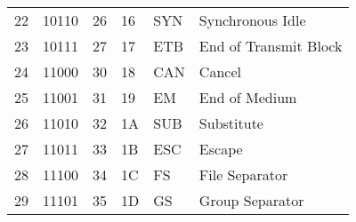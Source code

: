 \begin{center}
\begin{longtable}{llllll}
\rowcolor[HTML]{F3F6F6} 
{\color[HTML]{404040} 22}               & {\color[HTML]{404040} 10110}           & {\color[HTML]{404040} 26}             & {\color[HTML]{404040} 16}                   & {\color[HTML]{404040} SYN}                & {\color[HTML]{404040} Synchronous Idle}                      \\
\rowcolor[HTML]{FCFCFC} 
{\color[HTML]{404040} 23}               & {\color[HTML]{404040} 10111}           & {\color[HTML]{404040} 27}             & {\color[HTML]{404040} 17}                   & {\color[HTML]{404040} ETB}                & {\color[HTML]{404040} End of Transmit Block}                 \\
\rowcolor[HTML]{F3F6F6} 
{\color[HTML]{404040} 24}               & {\color[HTML]{404040} 11000}           & {\color[HTML]{404040} 30}             & {\color[HTML]{404040} 18}                   & {\color[HTML]{404040} CAN}                & {\color[HTML]{404040} Cancel}                                \\
\rowcolor[HTML]{FCFCFC} 
{\color[HTML]{404040} 25}               & {\color[HTML]{404040} 11001}           & {\color[HTML]{404040} 31}             & {\color[HTML]{404040} 19}                   & {\color[HTML]{404040} EM}                 & {\color[HTML]{404040} End of Medium}                         \\
\rowcolor[HTML]{F3F6F6} 
{\color[HTML]{404040} 26}               & {\color[HTML]{404040} 11010}           & {\color[HTML]{404040} 32}             & {\color[HTML]{404040} 1A}                   & {\color[HTML]{404040} SUB}                & {\color[HTML]{404040} Substitute}                            \\
\rowcolor[HTML]{FCFCFC} 
{\color[HTML]{404040} 27}               & {\color[HTML]{404040} 11011}           & {\color[HTML]{404040} 33}             & {\color[HTML]{404040} 1B}                   & {\color[HTML]{404040} ESC}                & {\color[HTML]{404040} Escape}                                \\
\rowcolor[HTML]{F3F6F6} 
{\color[HTML]{404040} 28}               & {\color[HTML]{404040} 11100}           & {\color[HTML]{404040} 34}             & {\color[HTML]{404040} 1C}                   & {\color[HTML]{404040} FS}                 & {\color[HTML]{404040} File Separator}                        \\
\rowcolor[HTML]{FCFCFC} 
{\color[HTML]{404040} 29}               & {\color[HTML]{404040} 11101}           & {\color[HTML]{404040} 35}             & {\color[HTML]{404040} 1D}                   & {\color[HTML]{404040} GS}                 & {\color[HTML]{404040} Group Separator}                       \\

\end{longtable}
\end{center}
